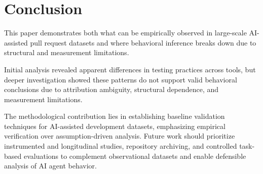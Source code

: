 \documentclass[conference]{IEEEtran}
\begin{document}
\section{Conclusion}

This paper demonstrates both what can be empirically observed in large-scale AI-assisted pull request datasets and where behavioral inference breaks down due to structural and measurement limitations.

Initial analysis revealed apparent differences in testing practices across tools, but deeper investigation showed these patterns do not support valid behavioral conclusions due to attribution ambiguity, structural dependence, and measurement limitations.

The methodological contribution lies in establishing baseline validation techniques for AI-assisted development datasets, emphasizing empirical verification over assumption-driven analysis. Future work should prioritize instrumented and longitudinal studies, repository archiving, and controlled task-based evaluations to complement observational datasets and enable defensible analysis of AI agent behavior.




\end{document}
